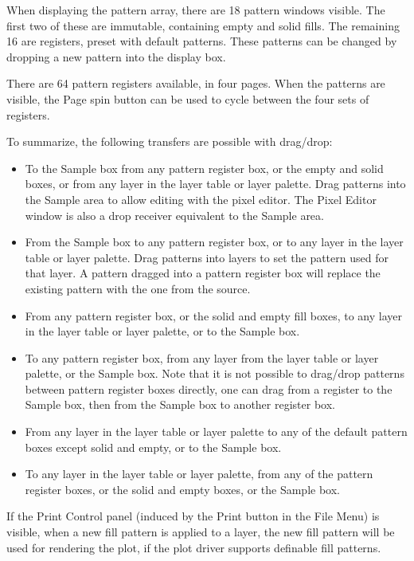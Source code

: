 When displaying the pattern array, there are 18 pattern windows
visible.  The first two of these are immutable, containing empty and
solid fills.  The remaining 16 are registers, preset with default
patterns.  These patterns can be changed by dropping a new pattern
into the display box.

There are 64 pattern registers available, in four pages.  When the
patterns are visible, the {\cb Page} spin button can be used to cycle
between the four sets of registers.

To summarize, the following transfers are possible with drag/drop:
\begin{itemize}
\item{To the {\cb Sample} box from any pattern register box, or the
empty and solid boxes, or from any layer in the layer table or layer
palette.  Drag patterns into the {\cb Sample} area to allow editing
with the pixel editor.  The {\cb Pixel Editor} window is also a drop
receiver equivalent to the {\cb Sample} area.}

\item{From the {\cb Sample} box to any pattern register box, or to
any layer in the layer table or layer palette.  Drag patterns into
layers to set the pattern used for that layer.  A pattern dragged
into a pattern register box will replace the existing pattern with
the one from the source.}

\item{From any pattern register box, or the solid and empty fill
boxes, to any layer in the layer table or layer palette, or to the
{\cb Sample} box.}

\item{To any pattern register box, from any layer from the layer table
or layer palette, or the {\cb Sample} box.  Note that it is not
possible to drag/drop patterns between pattern register boxes
directly, one can drag from a register to the {\cb Sample} box, then
from the {\cb Sample} box to another register box.}

\item{From any layer in the layer table or layer palette to any of
the default pattern boxes except solid and empty, or to the
{\cb Sample} box.}

\item{To any layer in the layer table or layer palette, from any of
the pattern register boxes, or the solid and empty boxes, or the {\cb
Sample} box.}
\end{itemize}

If the {\cb Print Control} panel (induced by the {\cb Print} button in
the {\cb File Menu}) is visible, when a new fill pattern is applied to
a layer, the new fill pattern will be used for rendering the plot, if
the plot driver supports definable fill patterns.

